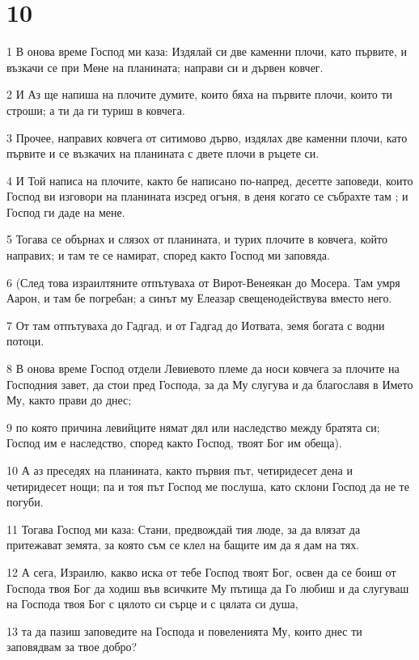 \chapter{10}

\par 1 В онова време Господ ми каза: Издялай си две каменни плочи, като първите, и възкачи се при Мене на планината; направи си и дървен ковчег.
\par 2 И Аз ще напиша на плочите думите, които бяха на първите плочи, които ти строши; а ти да ги туриш в ковчега.
\par 3 Прочее, направих ковчега от ситимово дърво, издялах две каменни плочи, като първите и се възкачих на планината с двете плочи в ръцете си.
\par 4 И Той написа на плочите, както бе написано по-напред, десетте заповеди, които Господ ви изговори на планината изсред огъня, в деня когато се събрахте там ; и Господ ги даде на мене.
\par 5 Тогава се обърнах и слязох от планината, и турих плочите в ковчега, който направих; и там те се намират, според както Господ ми заповяда.
\par 6 (След това израилтяните отпътуваха от Вирот-Венеякан до Мосера. Там умря Аарон, и там бе погребан; а синът му Елеазар свещенодействува вместо него.
\par 7 От там отпътуваха до Гадгад, и от Гадгад до Иотвата, земя богата с водни потоци.
\par 8 В онова време Господ отдели Левиевото племе да носи ковчега за плочите на Господния завет, да стои пред Господа, за да Му слугува и да благославя в Името Му, както прави до днес;
\par 9 по която причина левийците нямат дял или наследство между братята си; Господ им е наследство, според както Господ, твоят Бог им обеща).
\par 10 А аз преседях на планината, както първия път, четиридесет дена и четиридесет нощи; па и тоя път Господ ме послуша, като склони Господ да не те погуби.
\par 11 Тогава Господ ми каза: Стани, предвождай тия люде, за да влязат да притежават земята, за която съм се клел на бащите им да я дам на тях.
\par 12 А сега, Израилю, какво иска от тебе Господ твоят Бог, освен да се боиш от Господа твоя Бог да ходиш във всичките Му пътища да Го любиш и да слугуваш на Господа твоя Бог с цялото си сърце и с цялата си душа,
\par 13 та да пазиш заповедите на Господа и повеленията Му, които днес ти заповядвам за твое добро?
